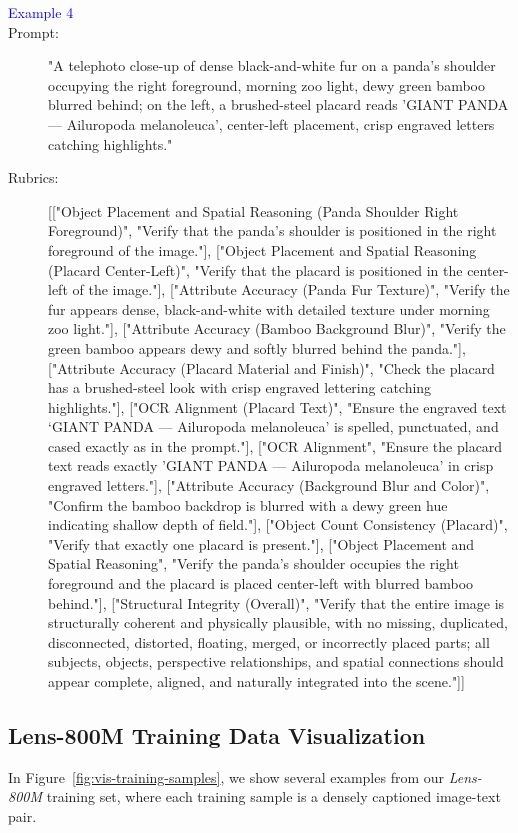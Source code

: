 \begin{tcolorbox}
\begin{description}
\item[\textcolor{blue}{Example 4}]
\item[Prompt:] "A telephoto close-up of dense black-and-white fur on a panda's shoulder occupying the right foreground, morning zoo light, dewy green bamboo blurred behind; on the left, a brushed-steel placard reads 'GIANT PANDA — Ailuropoda melanoleuca', center-left placement, crisp engraved letters catching highlights."
\item[Rubrics:] [["Object Placement and Spatial Reasoning (Panda Shoulder Right Foreground)", "Verify that the panda’s shoulder is positioned in the right foreground of the image."], ["Object Placement and Spatial Reasoning (Placard Center-Left)", "Verify that the placard is positioned in the center-left of the image."], ["Attribute Accuracy (Panda Fur Texture)", "Verify the fur appears dense, black-and-white with detailed texture under morning zoo light."], ["Attribute Accuracy (Bamboo Background Blur)", "Verify the green bamboo appears dewy and softly blurred behind the panda."], ["Attribute Accuracy (Placard Material and Finish)", "Check the placard has a brushed-steel look with crisp engraved lettering catching highlights."], ["OCR Alignment (Placard Text)", "Ensure the engraved text ‘GIANT PANDA — Ailuropoda melanoleuca’ is spelled, punctuated, and cased exactly as in the prompt."], ["OCR Alignment", "Ensure the placard text reads exactly 'GIANT PANDA — Ailuropoda melanoleuca' in crisp engraved letters."], ["Attribute Accuracy (Background Blur and Color)", "Confirm the bamboo backdrop is blurred with a dewy green hue indicating shallow depth of field."], ["Object Count Consistency (Placard)", "Verify that exactly one placard is present."], ["Object Placement and Spatial Reasoning", "Verify the panda's shoulder occupies the right foreground and the placard is placed center-left with blurred bamboo behind."], ["Structural Integrity (Overall)", "Verify that the entire image is structurally coherent and physically plausible, with no missing, duplicated, disconnected, distorted, floating, merged, or incorrectly placed parts; all subjects, objects, perspective relationships, and spatial connections should appear complete, aligned, and naturally integrated into the scene."]]


\end{description}
\end{tcolorbox}


\subsection{Lens-800M Training Data Visualization}
\label{sec:lens-800M visualization}
In Figure~\ref{fig:vis-training-samples}, we show several examples from our \textit{Lens-800M} training set, where each training sample is a densely captioned image-text pair.

